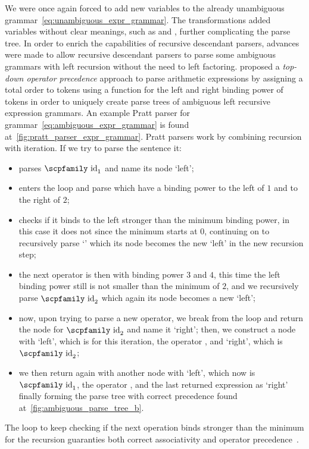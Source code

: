 \documentclass[
  oneside,
  english,
  coorientadorbanca,
  noabntexcite
]{ufsc-thesis-rn46-2019}
\newcommand{\codett}[1]{\text{\scpfamily#1}}
\newcommand{\code}[1]{\text{\scpfamily\setlength\spaceskip{0.35em}#1}}
\newcommand{\bnfvar}[1]{\codett{#1}}
\newcommand{\bnfter}[1]{\textrm{`}\codett{#1}\textrm{'}}
\begin{document}
We were once again forced to add new variables to the already unambiguous grammar~\eqref{eq:unambiguous_expr_grammar}.
The transformations added variables without clear meanings, such as \bnfvar{Expr2} and \bnfvar{Term2}, further complicating the parse tree.
In order to enrich the capabilities of recursive descendant parsers, advances were made to allow recursive descendant parsers to parse some ambiguous grammars with left recursion without the need to left factoring.
\textcite{pratt1973operatorprecedence} proposed a \textit{top-down operator precedence} approach to parse arithmetic expressions by assigning a total order to tokens using a function for the left and right binding power of tokens in order to uniquely create parse trees of ambiguous left recursive expression grammars.
An example Pratt parser for grammar~\eqref{eq:ambiguous_expr_grammar} is found at~\cref{fig:pratt_parser_expr_grammar}.
Pratt parsers work by combining recursion with iteration.
If we try to parse the sentence \code{$\code{id}_1$ + number * $\code{id}_2$} it:
\begin{itemize}
  \item parses $\codett{id}_1$ and name its node `left';
  \item enters the loop and parse \codett{+} which have a binding power to the left of $1$ and to the right of $2$;
  \item checks if it binds to the left stronger than the minimum binding power, in this case it does not since the minimum starts at $0$, continuing on to recursively parse \bnfter{number} which its node becomes the new `left' in the new recursion step;
  \item the next operator is then \codett{*} with binding power $3$ and $4$, this time the left binding power still is not smaller than the minimum of $2$, and we recursively parse $\codett{id}_2$ which again its node becomes a new `left';
  \item now, upon trying to parse a new operator, we break from the loop and return the node for $\codett{id}_2$ and name it `right'; then, we construct a node \bnfvar{Expr} with `left', which is \codett{number} for this iteration, the operator \codett{*}, and `right', which is $\codett{id}_2$;
  \item we then return again with another \bnfvar{Expr} node with `left', which now is $\codett{id}_1$, the operator \codett{+}, and the last returned expression as `right' finally forming the parse tree with correct precedence found at~\cref{fig:ambiguous_parse_tree_b}.
\end{itemize}
The loop to keep checking if the next operation binds stronger than the minimum for the recursion guaranties both correct associativity and operator precedence~\cite{pratt1973operatorprecedence}.
\end{document}
